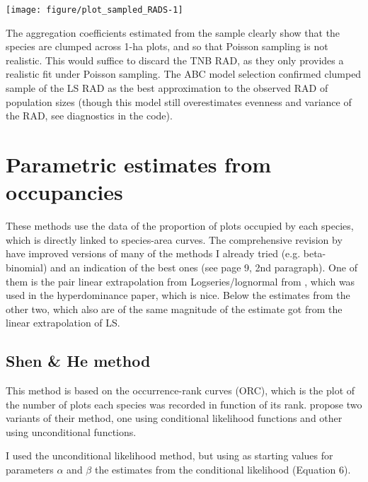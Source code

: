 \documentclass[12pt, A4]{article}\usepackage[]{graphicx}\usepackage[]{color}
\newenvironment{knitrout}{}{} %
\begin{document}
\begin{knitrout}
\color{fgcolor}

{\centering \texttt{[image: figure/plot\_sampled\_RADS-1]} 

}



\end{knitrout}

The aggregation coefficients estimated from the sample clearly show that
the species are clumped across 1-ha plots, and so that
Poisson sampling is not realistic. This would suffice to
discard the TNB RAD, as they only provides a realistic fit under Poisson sampling.
The ABC model selection confirmed clumped sample of the LS RAD as the
best approximation to the observed RAD of population sizes 
(though this model still overestimates evenness and variance of the RAD, see
diagnostics in the code).


\section{Parametric estimates from occupancies}

These methods use the data of the proportion of plots occupied by each species, which is directly linked to species-area curves.
The comprehensive revision by \citet{kunin2018} have improved versions of 
many of the methods I already tried 
(e.g. beta-binomial) and an indication of the best ones (see page 9, 2nd paragraph). 
One of them is  the pair linear extrapolation from Logseries/lognormal from \citet{ulrich2005}, which was used 
in the hyperdominance paper, which is nice. 
Below the estimates from the other two, which also are
of the same magnitude of the estimate got from the linear extrapolation of LS.


\subsection*{Shen \& He method}
\label{sec:shen--he}

This method is based on the occurrence-rank curves (ORC), which is the plot
of the number of plots each species was recorded in function of its rank.
\citet{shen2008} propose two variants of their method, one using
conditional likelihood functions and other using unconditional functions.

I used the unconditional likelihood method,
but using as starting values for parameters
$\alpha$ and $\beta$ the estimates from the conditional
likelihood (Equation 6).
\end{document}
